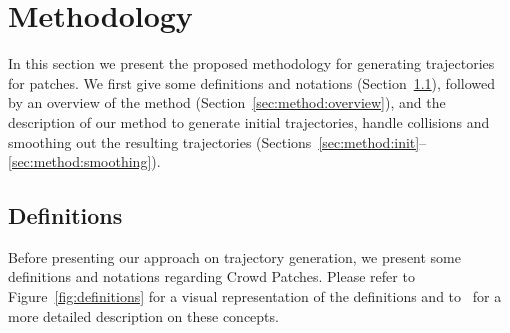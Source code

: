 \section{Methodology}
\label{sec:method}




In this section we present the proposed methodology for generating trajectories for patches.
We first give some definitions and notations (Section~\ref{sec:method:definitions}), followed by an overview of the method (Section~\ref{sec:method:overview}), and the description of our method to generate initial trajectories, handle collisions and smoothing out the resulting trajectories (Sections~\ref{sec:method:init}--\ref{sec:method:smoothing}).

\subsection{Definitions}
\label{sec:method:definitions}

Before presenting our approach on trajectory generation, we present some definitions and notations regarding Crowd Patches.
Please refer to Figure~\ref{fig:definitions} for a visual representation of the definitions and to~\cite{Yersin:2009} for a more detailed description on these concepts.

 
